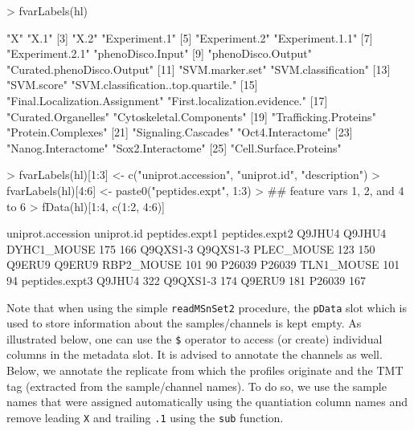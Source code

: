 \begin{Schunk}
\begin{Sinput}
> fvarLabels(hl)
\end{Sinput}
\begin{Soutput}
 [1] "X"                                 "X.1"                              
 [3] "X.2"                               "Experiment.1"                     
 [5] "Experiment.2"                      "Experiment.1.1"                   
 [7] "Experiment.2.1"                    "phenoDisco.Input"                 
 [9] "phenoDisco.Output"                 "Curated.phenoDisco.Output"        
[11] "SVM.marker.set"                    "SVM.classification"               
[13] "SVM.score"                         "SVM.classification..top.quartile."
[15] "Final.Localization.Assignment"     "First.localization.evidence."     
[17] "Curated.Organelles"                "Cytoskeletal.Components"          
[19] "Trafficking.Proteins"              "Protein.Complexes"                
[21] "Signaling.Cascades"                "Oct4.Interactome"                 
[23] "Nanog.Interactome"                 "Sox2.Interactome"                 
[25] "Cell.Surface.Proteins"            
\end{Soutput}
\begin{Sinput}
> fvarLabels(hl)[1:3] <- c("uniprot.accession", "uniprot.id", "description")
> fvarLabels(hl)[4:6] <- paste0("peptides.expt", 1:3)
> ## feature vars 1, 2, and 4 to 6
> fData(hl)[1:4, c(1:2, 4:6)]
\end{Sinput}
\begin{Soutput}
         uniprot.accession  uniprot.id peptides.expt1 peptides.expt2
Q9JHU4              Q9JHU4 DYHC1_MOUSE            175            166
Q9QXS1-3          Q9QXS1-3  PLEC_MOUSE            123            150
Q9ERU9              Q9ERU9  RBP2_MOUSE            101             90
P26039              P26039  TLN1_MOUSE            101             94
         peptides.expt3
Q9JHU4              322
Q9QXS1-3            174
Q9ERU9              181
P26039              167
\end{Soutput}
\end{Schunk}

Note that when using the simple \texttt{readMSnSet2} procedure, the
\texttt{pData} slot which is used to store information about the
samples/channels is kept empty. As illustrated below, one can use the
\texttt{\$} operator to access (or create) individual columns in the
metadata slot. It is advised to annotate the channels as well. Below,
we annotate the replicate from which the profiles originate and the
TMT tag (extracted from the sample/channel names). To do so, we use
the sample names that were assigned automatically using the
quantiation column names and remove leading \texttt{X} and trailing
\texttt{.1} using the \texttt{sub} function.

